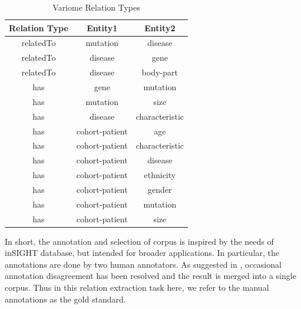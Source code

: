 \begin{table}[h]
	\caption{Variome Relation Types}
	\centering
	\label{table:Variome_Relations}
	\begin{tabular}{|c | c |c  |}
		\hline 
		{Relation Type} 
		& Entity1 & Entity2\\ 
		\hline
		relatedTo  & mutation & disease \\
		relatedTo & disease & gene\\
		relatedTo & disease & body-part\\
		\hline 
		has     & gene & mutation\\
		has     & mutation & size\\
		has     & disease & characteristic\\
		has     & cohort-patient & age\\
		has     & cohort-patient & characteristic\\
		has     & cohort-patient & disease\\
		has     & cohort-patient & ethnicity\\
		has     & cohort-patient & gender\\
		has     & cohort-patient & mutation\\
		has     & cohort-patient & size \\
		\hline 
	\end{tabular}
\end{table}
In short, the annotation and selection of corpus is inspired by the needs of inSIGHT database, but intended for broader applications. In particular, the annotations are done by two human annotators. As suggested in \cite{verspoor2013annotating}, occasional annotation disagreement has been resolved and the result is merged into a single corpus. Thus in this relation extraction task here, we refer to the manual annotations as the gold standard. 

